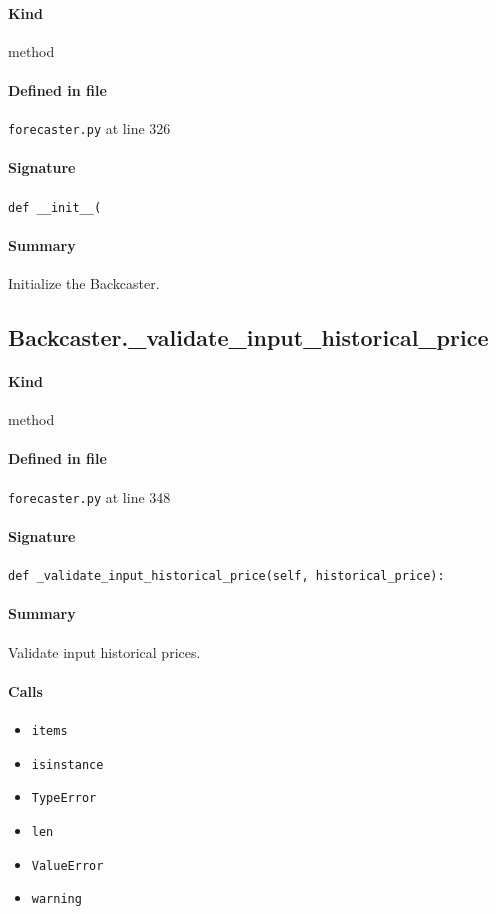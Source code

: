 \documentclass[11pt]{report}
\begin{document}
\paragraph{Kind} method
\paragraph{Defined in file} \texttt{forecaster.py} at line 326
\paragraph{Signature} \texttt{def \_\_init\_\_(}
\paragraph{Summary} Initialize the Backcaster.
\subsection{Backcaster.\_validate\_input\_historical\_price}
\label{def:forecaster.py:Backcaster._validate_input_historical_price:L348}
\paragraph{Kind} method
\paragraph{Defined in file} \texttt{forecaster.py} at line 348
\paragraph{Signature} \texttt{def \_validate\_input\_historical\_price(self, historical\_price):}
\paragraph{Summary} Validate input historical prices.
\paragraph{Calls}
\begin{itemize}[leftmargin=*]
  \item \texttt{items}
  \item \texttt{isinstance}
  \item \texttt{TypeError}
  \item \texttt{len}
  \item \texttt{ValueError}
  \item \texttt{warning}
\end{itemize}
\end{document}

